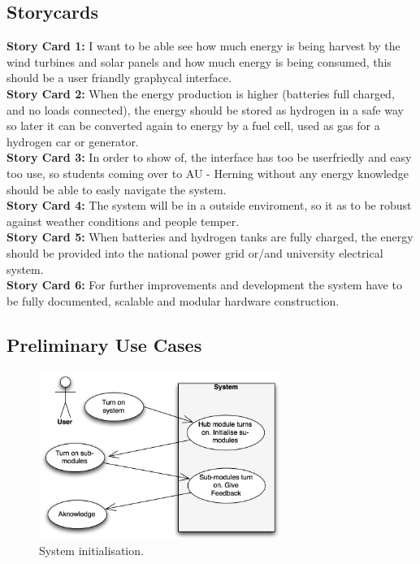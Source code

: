 \subsection{Storycards}
\textbf{Story Card 1:} I want to be able see how much energy is being harvest by
the wind turbines and solar panels and how much energy is being consumed, this should be
a user friandly graphycal interface.\\
\newline
\textbf{Story Card 2:} When the energy production is higher (batteries full
charged, and no loads connected), the energy should be stored as hydrogen in a safe way so
later it can be converted again to energy by a fuel cell, used as gas for a
hydrogen car or generator.\\
\newline
\textbf{Story Card 3:} In order to show of, the interface has too be userfriedly
and easy too use, so students coming over to AU - Herning without any energy
knowledge should be able to easly navigate the system.\\
\newline
\textbf{Story Card 4:} The system will be in a outside enviroment, so it as to
be robust against weather conditions and people temper.\\
\newline
\textbf{Story Card 5:} When batteries and hydrogen tanks are fully charged, the
energy should be provided into the national power grid or/and university electrical
system.\\
\newline
\textbf{Story Card 6:} For further improvements and development the system have
to be fully documented, scalable and modular hardware construction.\\
\newpage
\subsection{Preliminary Use Cases}

\begin{figure}[!h]
	\begin{centering}
		\includegraphics[width=0.7\textwidth]{images/usecases1.jpg}
		\caption{System initialisation. }
	\end{centering}
\end{figure}

